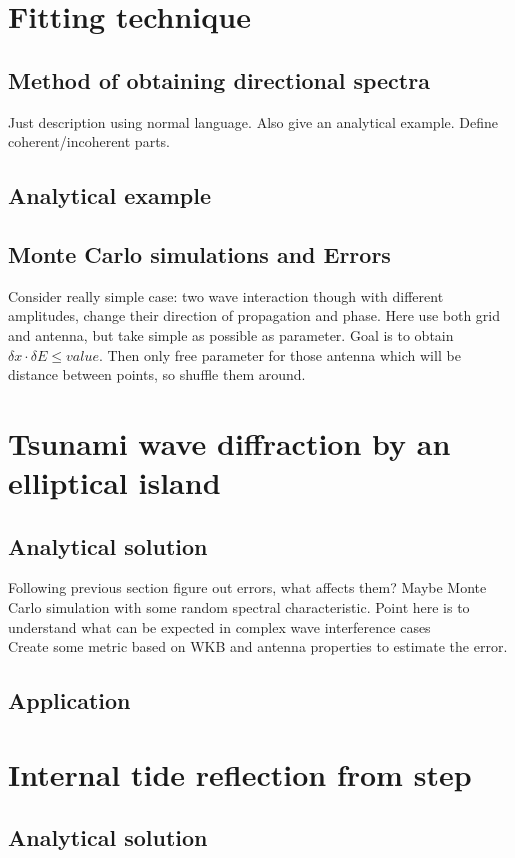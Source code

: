 \section{Fitting technique}
\subsection{Method of obtaining directional spectra}
Just description using normal language. Also give an analytical example. Define coherent/incoherent parts.

\subsection{Analytical example}

\subsection{Monte Carlo simulations and Errors}
Consider really simple case: two wave interaction though with different amplitudes, change their direction of propagation and phase. Here use both grid and antenna, but take simple as possible as parameter. Goal is to obtain $\delta x \cdot \delta E \leq value$. Then only free parameter for those antenna which will be distance between points, so shuffle them around.

\section{Tsunami wave diffraction by an elliptical island}
\subsection{Analytical solution}
Following previous section figure out errors, what affects them? Maybe Monte Carlo simulation with some random spectral characteristic. Point here is to understand what can be expected in complex wave interference cases\\
Create some metric based on WKB and antenna properties to estimate the error.
\subsection{Application}

\section{Internal tide reflection from step}
\subsection{Analytical solution}
